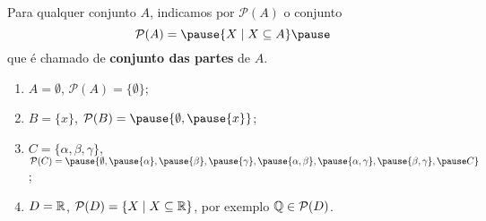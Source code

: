 \documentclass{beamer}
\begin{document}
    \begin{frame}
        \begin{definicao}
            Para qualquer conjunto $A$, \pause indicamos por $\mathcal{P}(A)$ \pause o conjunto\pause
            \[
                \mathcal{P}(A) = \pause \{ X \mid X\subseteq A\}\pause
            \]
            que \'e chamado de \textbf{conjunto das partes} de $A$.\pause
        \end{definicao}


        \begin{exemplos}
            \begin{enumerate}[label={\arabic*})]
                \item $A = \emptyset$, \pause $\mathcal{P}(A) = \{\emptyset\}$;\pause
                \item $B = \{x\}$, \pause $\mathcal{P}(B) = \pause \{\emptyset, \pause \{x\}\}$;\pause
                \item $C = \{\alpha,\beta,\gamma\}$, \pause $\mathcal{P}(C) = \pause \{\emptyset, \pause\{\alpha\}, \pause\{\beta\}, \pause\{\gamma\}, \pause\{\alpha,\beta\}, \pause\{\alpha,\gamma\}, \pause\{\beta,\gamma\}, \pause C\}$;\pause
                \item $D=\mathbb{R}$, \pause $\mathcal{P}(D) = \{X \mid X \subseteq \mathbb{R}\}$, \pause por exemplo $\mathbb{Q} \in \mathcal{P}(D)$.
            \end{enumerate}
        \end{exemplos}
    \end{frame}
\end{document}
